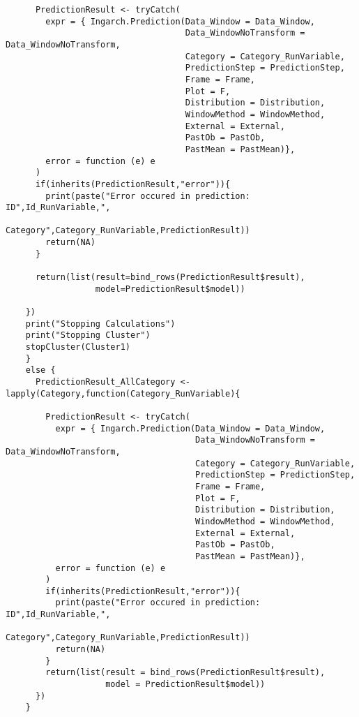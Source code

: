 \begin{verbatim}
      PredictionResult <- tryCatch(
        expr = { Ingarch.Prediction(Data_Window = Data_Window,
                                    Data_WindowNoTransform = Data_WindowNoTransform,
                                    Category = Category_RunVariable,
                                    PredictionStep = PredictionStep,
                                    Frame = Frame,
                                    Plot = F,
                                    Distribution = Distribution,
                                    WindowMethod = WindowMethod,
                                    External = External,
                                    PastOb = PastOb,
                                    PastMean = PastMean)},
        error = function (e) e
      )
      if(inherits(PredictionResult,"error")){
        print(paste("Error occured in prediction: ID",Id_RunVariable,", 
										              Category",Category_RunVariable,PredictionResult))
        return(NA)
      }
      
      return(list(result=bind_rows(PredictionResult$result),
                  model=PredictionResult$model))
      
    })
    print("Stopping Calculations")
    print("Stopping Cluster")
    stopCluster(Cluster1)
    } 
    else {
      PredictionResult_AllCategory <- lapply(Category,function(Category_RunVariable){
        
        PredictionResult <- tryCatch(
          expr = { Ingarch.Prediction(Data_Window = Data_Window,
                                      Data_WindowNoTransform = Data_WindowNoTransform,
                                      Category = Category_RunVariable,
                                      PredictionStep = PredictionStep,
                                      Frame = Frame,
                                      Plot = F,
                                      Distribution = Distribution,
                                      WindowMethod = WindowMethod,
                                      External = External,
                                      PastOb = PastOb,
                                      PastMean = PastMean)},
          error = function (e) e
        )
        if(inherits(PredictionResult,"error")){
          print(paste("Error occured in prediction: ID",Id_RunVariable,", 
											Category",Category_RunVariable,PredictionResult))
          return(NA)
        }
        return(list(result = bind_rows(PredictionResult$result),
                    model = PredictionResult$model))
      })
    }
    

\end{verbatim}
